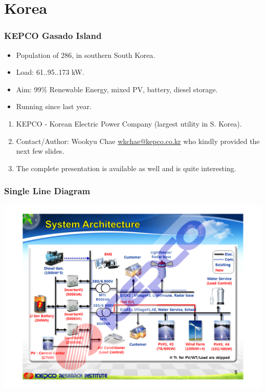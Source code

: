 \documentclass{beamer}
\begin{document}
\section{Korea}
\begin{frame}\frametitle{KEPCO Gasado Island}
  \begin{itemize}
  \item Population of 286, in southern South Korea.
  \item Load: 61..95..173 kW.
  \item Aim: 99\% Renewable Energy, mixed PV, battery, diesel storage.
  \item Running since last year. 
  \end{itemize}
\pause
  \begin{enumerate}
  \item KEPCO - Korean Electric Power Company (largest utility in S. Korea).
  \item Contact/Author: Wookyu Chae
    \href{wkchae@kepco.co.kr}{wkchae@kepco.co.kr} who kindly provided
    the next few slides.
  \item The complete presentation is available as well and is quite interesting.
  \end{enumerate}
\end{frame}

\begin{frame}\frametitle{Single Line Diagram}
\includegraphics[width=\hsize]{KEPCO-SLD.pdf}
\end{frame}
\end{document}
